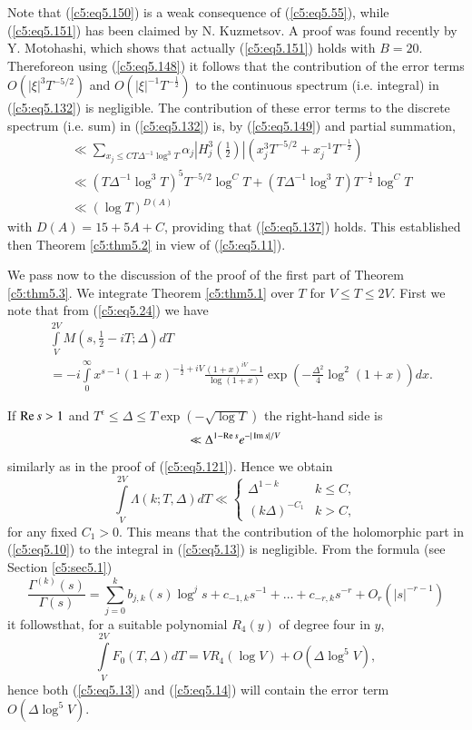 Note that (\ref{c5:eq5.150}) is a weak consequence of
(\ref{c5:eq5.55}), while (\ref{c5:eq5.151}) has been claimed by
N. Kuzmetsov. A proof was found recently by Y. Motohashi, which shows
that actually (\ref{c5:eq5.151}) holds with $B =20$. 
Therefore\pageoriginale on using (\ref{c5:eq5.148}) it follows that
the contribution of the error terms $O(|\xi|^3 T^{-5/2})$ and
$O(|\xi|^{-1} T^{-\frac{1}{2}})$ to the continuous spectrum
(i.e. integral) in (\ref{c5:eq5.132}) is negligible. The contribution
of these error terms to the discrete spectrum (i.e. sum) in
(\ref{c5:eq5.132}) is, by (\ref{c5:eq5.149}) and partial summation, 
\begin{align*}
&\ll \sum\limits_{x_j \leq C T \Delta^{-1} \log^3 T} \alpha_j \left|H^3_j 
  \left(\frac{1}{2} \right)\right| \left(x^3_j T^{-5/2} + x^{-1}_j
  T^{-\frac{1}{2}}\right)\\   
&\ll \left(T\Delta^{-1} \log^3 T\right)^5 T^{-5/2} \log^C T +
  \left(T\Delta^{-1} \log^3 T\right) T^{-\frac{1}{2}} \log^C T\\
&\ll (\log T)^{D(A)} 
\end{align*}
with $D(A) = 15 + 5A + C$, providing that (\ref{c5:eq5.137})
holds. This established then Theorem \ref{c5:thm5.2} in view of
(\ref{c5:eq5.11}). 

We pass now to the discussion of the proof of the first part of
Theorem \ref{c5:thm5.3}. We integrate Theorem \ref{c5:thm5.1} over $T$
for $V \leq T \leq 2V$. First we note that from (\ref{c5:eq5.24}) we
have 
\begin{align*}
& \int\limits^{2V}_V M \left(s, \frac{1}{2} - iT;\Delta \right) dT\\
& = - i \int\limits^\infty_0 x^{s-1} (1+x)^{-\frac{1}{2} + iV} \frac{(1+x)^{iV} -1}{\log (1+x)} \exp \left(-\frac{\Delta^2}{4} \log^2 (1+x) \right) dx. 
\end{align*}

If $\operatorname{Re} s >1$ and $T^{\epsilon} \leq \Delta \leq T \exp (-\sqrt{\log
  T})$ the right-hand side is  
$$
\ll \Delta^{1-\operatorname{Re} s} e^{-|\operatorname{Im} s|/V}
$$
similarly as in the proof of (\ref{c5:eq5.121}). Hence we obtain
$$
\int\limits^{2V}_V \Lambda (k;T,\Delta) dT \ll
\begin{cases}
\Delta^{1-k}  &  k \leq C,\\
(k\Delta)^{-C_1} &  k > C,
\end{cases}
$$
for any fixed $C_1 >0$. This means that the contribution of the
holomorphic part in (\ref{c5:eq5.10}) to the integral in
(\ref{c5:eq5.13}) is negligible. From the formula (see Section
\ref{c5:sec5.1}) 
\begin{equation*}
\frac{\Gamma^{(k)} (s)}{\Gamma(s)}  = \sum\limits^k_{j=0} b_{j,k} (s)
\log^j s + c_{-1,k} s^{-1} + \ldots + c_{-r, k} s^{-r}  + O_r
\left(|s|^{-r-1}\right) 
\end{equation*}
it follows\pageoriginale that, for a suitable polynomial $R_4 (y)$ of
degree four in $y$, 
$$
\int\limits^{2V}_V F_0 (T,\Delta) dT = V R_4 (\log V) + O(\Delta
\log^5 V), 
$$
hence both (\ref{c5:eq5.13}) and (\ref{c5:eq5.14}) will contain the
error term $O(\Delta \log^5 V)$. 

